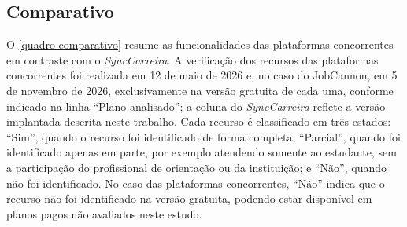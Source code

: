 \subsection{Comparativo}

O \autoref{quadro-comparativo} resume as funcionalidades das plataformas concorrentes em contraste com o \textit{SyncCarreira}. A verificação dos recursos das plataformas concorrentes foi realizada em 12 de maio de 2026 e, no caso do JobCannon, em 5 de novembro de 2026, exclusivamente na versão gratuita de cada uma, conforme indicado na linha ``Plano analisado''; a coluna do \textit{SyncCarreira} reflete a versão implantada descrita neste trabalho. Cada recurso é classificado em três estados: ``Sim'', quando o recurso foi identificado de forma completa; ``Parcial'', quando foi identificado apenas em parte, por exemplo atendendo somente ao estudante, sem a participação do profissional de orientação ou da instituição; e ``Não'', quando não foi identificado. No caso das plataformas concorrentes, ``Não'' indica que o recurso não foi identificado na versão gratuita, podendo estar disponível em planos pagos não avaliados neste estudo.

